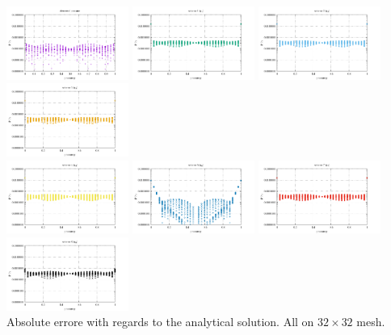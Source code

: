 \begin{center}
\includegraphics[width=4cm]{python_codes/fieldstone_12/results/reg/p_error}
\includegraphics[width=4cm]{python_codes/fieldstone_12/results/reg/q1_error}
\includegraphics[width=4cm]{python_codes/fieldstone_12/results/reg/q2_error}
\includegraphics[width=4cm]{python_codes/fieldstone_12/results/reg/q3_error}\\
\includegraphics[width=4cm]{python_codes/fieldstone_12/results/reg/q4_error}
\includegraphics[width=4cm]{python_codes/fieldstone_12/results/reg/q6_error}
\includegraphics[width=4cm]{python_codes/fieldstone_12/results/reg/q7_error}
\includegraphics[width=4cm]{python_codes/fieldstone_12/results/reg/q8_error}\\
{\captionfont 
Absolute errore with regards to the analytical solution. All on $32\times 32$ mesh.}
\end{center}

